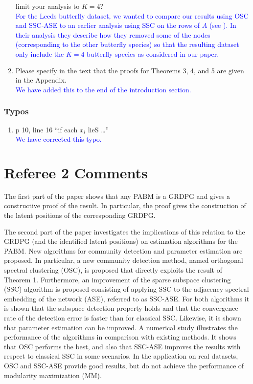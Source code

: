 \documentclass[
]{article}
\providecommand{\tightlist}{%
  \setlength{\itemsep}{0pt}\setlength{\parskip}{0pt}}
\begin{document}
\begin{enumerate}
  limit your analysis to \(K = 4\)?\\
  \textcolor{blue}{
  For the Leeds butterfly dataset, we wanted to compare our results
  using OSC and SSC-ASE to an earlier analysis using SSC on the rows of
  $A$ (see \citep{noroozi2019estimation}). In their analysis they
  describe how they removed some of the nodes (corresponding to the
  other butterfly species) so that the resulting dataset only include the
  $K = 4$ butterfly species as considered in our paper.}
\item
  Please specify in the text that the proofs for Theorems 3, 4, and 5
  are given in the Appendix.\\
  \textcolor{blue}{
  We have added this to the end of the introduction section.
  }
\end{enumerate}

\hypertarget{typos}{%
\subsubsection{Typos}\label{typos}}

\begin{enumerate}
\def\labelenumi{\arabic{enumi}.}
\tightlist
\item
  p 10, line 16 ``if each \(x_i\) lieS \ldots{}''\\
  \textcolor{blue}{
  We have corrected this typo. 
  }
\end{enumerate}

\hypertarget{referee-2-comments}{%
\section{Referee 2 Comments}\label{referee-2-comments}}

The first part of the paper shows that any PABM is a GRDPG and gives a
constructive proof of the result. In particular, the proof gives the
construction of the latent positions of the corresponding GRDPG.

The second part of the paper investigates the implications of this
relation to the GRDPG (and the identified latent positions) on
estimation algorithms for the PABM. New algorithms for community
detection and parameter estimation are proposed. In particular, a new
community detection method, named orthogonal spectral clustering (OSC),
is proposed that directly exploits the result of Theorem 1. Furthermore,
an improvement of the sparse subspace clustering (SSC) algorithm is
proposed consisting of applying SSC to the adjacency spectral embedding
of the network (ASE), referred to as SSC-ASE. For both algorithms it is
shown that the subspace detection property holds and that the
convergence rate of the detection error is faster than for classical
SSC. Likewise, it is shown that parameter estimation can be improved. A
numerical study illustrates the performance of the algorithms in
comparison with existing methods. It shows that OSC performs the best,
and also that SSC-ASE improves the results with respect to classical SSC
in some scenarios. In the application on real datasets, OSC and SSC-ASE
provide good results, but do not achieve the performance of modularity
maximization (MM).
\end{document}
